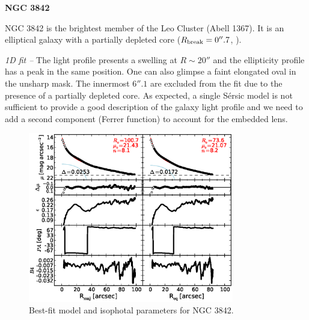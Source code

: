 \documentclass[preprint2]{emulateapj}
\newcommand{\fitfigurewidth}{0.8\textwidth}
\begin{document}
  \clearpage\newpage\noindent
  {\bf NGC 3842 \\}

  NGC 3842 is the brightest member of the Leo Cluster (Abell 1367).
  It is an elliptical galaxy with a partially depleted core ($R_{\rm break} = 0''.7$, 
  \citealt{rusli2013,dullograham2014cores}).


  \emph{1D fit -- }
  The light profile presents a swelling at $R \sim 20''$ and the ellipticity profile has a peak in the same position.
  One can also glimpse a faint elongated oval in the unsharp mask.
  The innermost $6''.1$ are excluded from the fit due to the presence of a partially depleted core.
  As expected, a single S\'ersic model is not sufficient to provide a good description of the galaxy light profile 
  and we need to add a second component (Ferrer function) to account for the embedded lens.

  \begin{figure}[h]
  \begin{center}
  \includegraphics[width=\fitfigurewidth]{images/n3842exp_1Dfit.eps}
  \caption{Best-fit model and isophotal parameters for NGC 3842.}
  \end{center}
  \end{figure}
\end{document}
